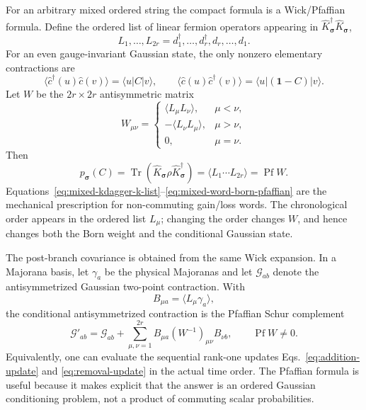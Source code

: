 \documentclass[aps,prb,onecolumn,nofootinbib,superscriptaddress]{revtex4-2}
\newcommand{\I}{\mathbf{1}}
\newcommand{\Tr}{\operatorname{Tr}}
\theoremstyle{plain}
\theoremstyle{definition}
\begin{document}
For an arbitrary mixed ordered string the compact formula is a Wick/Pfaffian
formula.  Define the ordered list of linear fermion operators appearing in
\(\hat K_{\bm\sigma}^\dagger\hat K_{\bm\sigma}\),
\begin{equation}
  L_1,\ldots,L_{2r}
  =
  d_1^\dagger,\ldots,d_r^\dagger,d_r,\ldots,d_1 .
  \label{eq:mixed-kdagger-k-list}
\end{equation}
For an even gauge-invariant Gaussian state, the only nonzero elementary
contractions are
\begin{equation}
  \langle \hat c^\dagger(u)\hat c(v)\rangle
  =
  \langle u|C|v\rangle,
  \qquad
  \langle \hat c(u)\hat c^\dagger(v)\rangle
  =
  \langle u|(\I-C)|v\rangle .
  \label{eq:number-conserving-wick-contractions}
\end{equation}
Let \(W\) be the \(2r\times2r\) antisymmetric matrix
\begin{equation}
  W_{\mu\nu}=
  \begin{cases}
    \langle L_\mu L_\nu\rangle, & \mu<\nu,\\
    -\langle L_\nu L_\mu\rangle, & \mu>\nu,\\
    0, & \mu=\nu .
  \end{cases}
  \label{eq:mixed-wick-matrix}
\end{equation}
Then
\begin{equation}
  p_{\bm\sigma}(C)
  =
  \Tr(\hat K_{\bm\sigma}\rho\hat K_{\bm\sigma}^\dagger)
  =
  \langle L_1\cdots L_{2r}\rangle
  =
  \operatorname{Pf} W .
  \label{eq:mixed-word-born-pfaffian}
\end{equation}
Equations~\eqref{eq:mixed-kdagger-k-list}--\eqref{eq:mixed-word-born-pfaffian}
are the mechanical prescription for non-commuting gain/loss words.  The
chronological order appears in the ordered list \(L_\mu\); changing the order
changes \(W\), and hence changes both the Born weight and the conditional
Gaussian state.

The post-branch covariance is obtained from the same Wick expansion.  In a
Majorana basis, let \(\gamma_a\) be the physical Majoranas and let
\(\mathcal G_{ab}\) denote the antisymmetrized Gaussian two-point contraction.
With
\begin{equation}
  B_{\mu a}=\langle L_\mu\gamma_a\rangle,
  \label{eq:mixed-schur-B}
\end{equation}
the conditional antisymmetrized contraction is the Pfaffian Schur complement
\begin{equation}
  \mathcal G'_{ab}
  =
  \mathcal G_{ab}
  +
  \sum_{\mu,\nu=1}^{2r}
  B_{\mu a}(W^{-1})_{\mu\nu}B_{\nu b},
  \qquad
  \operatorname{Pf}W\ne0 .
  \label{eq:mixed-pfaffian-schur-update}
\end{equation}
Equivalently, one can evaluate the sequential rank-one updates
Eqs.~\eqref{eq:addition-update} and \eqref{eq:removal-update} in the actual
time order.  The Pfaffian formula is useful because it makes explicit that
the answer is an ordered Gaussian conditioning problem, not a product of
commuting scalar probabilities.
\end{document}
